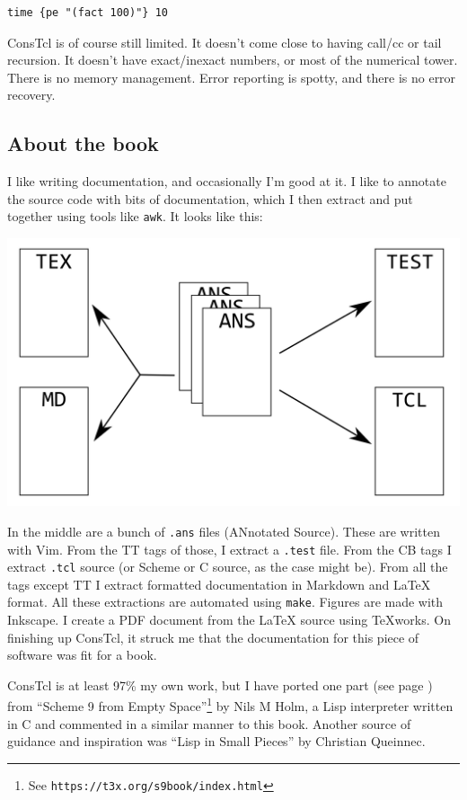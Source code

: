 \documentclass[twoside,9pt]{report}
\begin{document}
\begin{verbatim}
time {pe "(fact 100)"} 10
\end{verbatim}

ConsTcl is of course still limited. It doesn't come close to having call/cc or
tail recursion. It doesn't have exact/inexact numbers, or most of the numerical
tower. There is no memory management. Error reporting is spotty, and there is no
error recovery.

\subsection{About the book}
\label{about-the-book}


I like writing documentation, and occasionally I'm good at it. I like to
annotate the source code with bits of documentation, which I then extract and
put together using tools like \texttt{awk}. It looks like this:

\includegraphics{images/document.png}

In the middle are a bunch of \texttt{.ans} files (ANnotated Source). These are
written with Vim. From the TT tags of those, I extract a \texttt{.test} file.
From the CB tags I extract \texttt{.tcl} source (or Scheme or C source, as the case might
be). From all the tags except TT I extract formatted documentation in Markdown
and \LaTeX{} format. All these extractions are automated using \texttt{make}.
Figures are made with Inkscape.  I create a PDF document from the \LaTeX{}
source using TeXworks. On finishing up ConsTcl, it struck me that the
documentation for this piece of software was fit for a book.

ConsTcl is at least 97\% my own work, but I have ported one part (see page
\pageref{resolving-local-defines}) from ``Scheme 9 from Empty
Space''\footnote{See \texttt{https://t3x.org/s9book/index.html}} by Nils M
Holm, a Lisp interpreter written in C and commented in a similar manner to this
book. Another source of guidance and inspiration was ``Lisp in Small Pieces'' by
Christian Queinnec.
\end{document}
